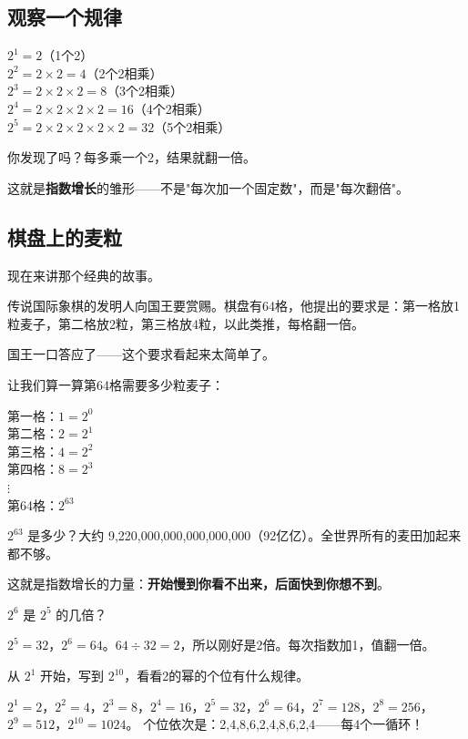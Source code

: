 

\subsection*{观察一个规律}

$2^1=2$（1个2）\\
$2^2=2\times2=4$（2个2相乘）\\
$2^3=2\times2\times2=8$（3个2相乘）\\
$2^4=2\times2\times2\times2=16$（4个2相乘）\\
$2^5=2\times2\times2\times2\times2=32$（5个2相乘）

你发现了吗？每多乘一个2，结果就翻一倍。

这就是\textbf{指数增长}的雏形——不是"每次加一个固定数"，而是"每次翻倍"。

\subsection*{棋盘上的麦粒}

现在来讲那个经典的故事。

传说国际象棋的发明人向国王要赏赐。棋盘有64格，他提出的要求是：第一格放1粒麦子，第二格放2粒，第三格放4粒，以此类推，每格翻一倍。

国王一口答应了——这个要求看起来太简单了。

让我们算一算第64格需要多少粒麦子：

第一格：$1 = 2^0$\\
第二格：$2 = 2^1$\\
第三格：$4 = 2^2$\\
第四格：$8 = 2^3$\\
$\vdots$\\
第64格：$2^{63}$

$2^{63}$ 是多少？大约 9,220,000,000,000,000,000（92亿亿）。全世界所有的麦田加起来都不够。

这就是指数增长的力量：\textbf{开始慢到你看不出来，后面快到你想不到}。

\begin{example}
$2^6$ 是 $2^5$ 的几倍？
\end{example}
\begin{solution}
$2^5=32$，$2^6=64$。$64\div32=2$，所以刚好是2倍。每次指数加1，值翻一倍。
\end{solution}

\begin{example}
从 $2^1$ 开始，写到 $2^{10}$，看看2的幂的个位有什么规律。
\end{example}
\begin{solution}
$2^1=2$，$2^2=4$，$2^3=8$，$2^4=16$，$2^5=32$，$2^6=64$，$2^7=128$，$2^8=256$，$2^9=512$，$2^{10}=1024$。
个位依次是：2,4,8,6,2,4,8,6,2,4——每4个一循环！
\end{solution}

